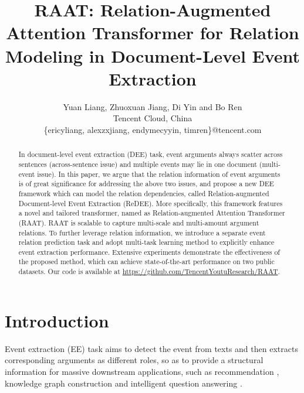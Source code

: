 \documentclass[11pt]{article}
\title{RAAT: Relation-Augmented Attention Transformer for Relation Modeling in Document-Level Event Extraction}
\author{Yuan Liang\footnotemark[1], Zhuoxuan Jiang\footnotemark[1],  Di Yin and Bo Ren \\ Tencent Cloud, China \\
        \{ericyliang, alexzxjiang, endymecyyin, timren\}@tencent.com }
\begin{document}
\maketitle
\def\thefootnote{*}
\begin{abstract}

In document-level event extraction (DEE) task, event arguments always scatter across sentences (across-sentence issue) and multiple events may lie in one document (multi-event issue). In this paper, we argue that the relation information of event arguments is of great significance for addressing the above two issues, and propose a new DEE framework which can model the relation dependencies, called Relation-augmented Document-level Event Extraction (ReDEE). More specifically, this framework features a novel and tailored transformer, named as Relation-augmented Attention Transformer (RAAT). RAAT is scalable to capture multi-scale and multi-amount argument relations. To further leverage relation information, we introduce a separate event relation prediction task and adopt multi-task learning method to explicitly enhance event extraction performance. Extensive experiments demonstrate the effectiveness of the proposed method, which can achieve state-of-the-art performance on two public datasets. Our code is available at \url{https://github.com/TencentYoutuResearch/RAAT}.




\end{abstract}

\section{Introduction}

Event extraction (EE) task aims to detect the event from texts and then extracts corresponding arguments as different roles, so as to provide a structural information for massive downstream applications, such as recommendation \citep{Li-Gao-re,Chun-Yi-CPMF}, knowledge graph construction \citep{Xindong-graph,Antoine-graph} and intelligent question answering \citep{Jordan-QA,Qingqing-QA}.
\end{document}
